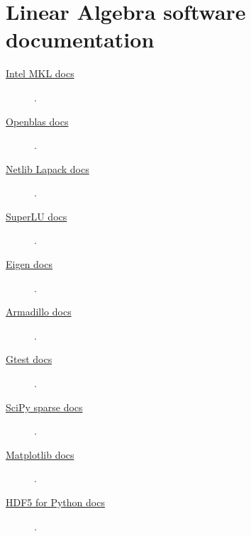 \section{Linear Algebra software documentation}

\begin{description}
	\item[\href{https://www.intel.com/content/www/us/en/developer/tools/oneapi/onemkl-documentation.html}{Intel MKL docs}]

	      .

	\item[\href{http://www.openmathlib.org/OpenBLAS/docs}{Openblas docs}]

	      .

	\item[\href{https://www.netlib.org/lapack/explore-html}{Netlib Lapack docs}]

	      .

	\item[\href{https://portal.nersc.gov/project/sparse/superlu/superlu_code_html/index.html}{SuperLU docs}]

	      .

	\item[\href{https://eigen.tuxfamily.org/dox}{Eigen docs}]

	      .

	\item[\href{https://arma.sourceforge.net/docs.html}{Armadillo docs}]

	      .
\end{description}

\begin{description}
	\item[\href{https://google.github.io/googletest}{Gtest docs}]

	      .

	\item[\href{https://docs.scipy.org/doc/scipy/reference/sparse.html}{SciPy sparse docs}]

	      .

	\item[\href{https://matplotlib.org/stable/api/_as_gen/matplotlib.pyplot.plot.html}{Matplotlib docs}]

	      .

	\item[\href{https://docs.h5py.org/en/stable}{HDF5 for Python docs}]

	      .
\end{description}

